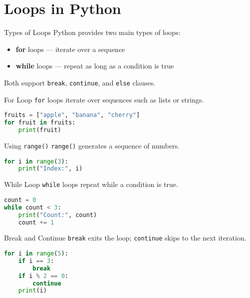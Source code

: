 \section{Loops in Python}
\begin{frame}[plain]
\sectionpage
\end{frame}


\begin{frame}{Types of Loops}
Python provides two main types of loops:
\begin{itemize}
    \item \textbf{for} loops — iterate over a sequence
    \item \textbf{while} loops — repeat as long as a condition is true
\end{itemize}
Both support \texttt{break}, \texttt{continue}, and \texttt{else} clauses.
\end{frame}

\begin{frame}[fragile]{For Loop}
\texttt{for} loops iterate over sequences such as lists or strings.

\begin{lstlisting}[language=Python]
fruits = ["apple", "banana", "cherry"]
for fruit in fruits:
    print(fruit)
\end{lstlisting}
\end{frame}

\begin{frame}[fragile]{Using \texttt{range()}}
\texttt{range()} generates a sequence of numbers.

\begin{lstlisting}[language=Python]
for i in range(3):
    print("Index:", i)
\end{lstlisting}
\end{frame}

\begin{frame}[fragile]{While Loop}
\texttt{while} loops repeat while a condition is true.

\begin{lstlisting}[language=Python]
count = 0
while count < 3:
    print("Count:", count)
    count += 1
\end{lstlisting}
\end{frame}

\begin{frame}[fragile]{Break and Continue}
\texttt{break} exits the loop; \texttt{continue} skips to the next iteration.

\begin{lstlisting}[language=Python]
for i in range(5):
    if i == 3:
        break
    if i % 2 == 0:
        continue
    print(i)
\end{lstlisting}
\end{frame}

